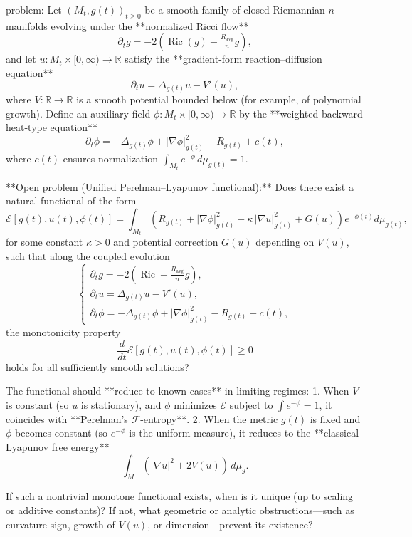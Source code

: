 problem:  
Let \((M_t,g(t))_{t\ge0}\) be a smooth family of closed Riemannian \(n\)-manifolds evolving under the **normalized Ricci flow**
\[
\partial_t g = -2(\operatorname{Ric}(g) - \tfrac{R_{\mathrm{avg}}}{n} g),
\]
and let \(u : M_t\times [0,\infty)\to \mathbb{R}\) satisfy the **gradient-form reaction–diffusion equation**
\[
\partial_t u = \Delta_{g(t)}u - V'(u),
\]
where \(V:\mathbb{R}\to\mathbb{R}\) is a smooth potential bounded below (for example, of polynomial growth).  
Define an auxiliary field \(\phi:M_t\times [0,\infty)\to \mathbb{R}\) by the **weighted backward heat-type equation**
\[
\partial_t \phi = -\Delta_{g(t)}\phi + |\nabla \phi|_{g(t)}^2 - R_{g(t)} + c(t),
\]
where \(c(t)\) ensures normalization \(\int_{M_t} e^{-\phi}\, d\mu_{g(t)} = 1.\)

**Open problem (Unified Perelman–Lyapunov functional):**  
Does there exist a natural functional of the form
\[
\mathcal{E}[g(t),u(t),\phi(t)]
= \int_{M_t}\left(R_{g(t)} + |\nabla\phi|_{g(t)}^2 
+ \kappa\,|\nabla u|_{g(t)}^2 + G(u)\right)e^{-\phi(t)}d\mu_{g(t)},
\]
for some constant \(\kappa>0\) and potential correction \(G(u)\) depending on \(V(u)\), such that along the coupled evolution
\[
\begin{cases}
\partial_t g = -2(\operatorname{Ric} - \tfrac{R_{\mathrm{avg}}}{n} g),\\[0.3em]
\partial_t u = \Delta_{g(t)}u - V'(u),\\[0.3em]
\partial_t \phi = -\Delta_{g(t)}\phi + |\nabla\phi|_{g(t)}^2 - R_{g(t)} + c(t),
\end{cases}
\]
the monotonicity property
\[
\frac{d}{dt}\mathcal{E}[g(t),u(t),\phi(t)]\ge 0
\]
holds for all sufficiently smooth solutions?

The functional should **reduce to known cases** in limiting regimes:
1. When \(V\) is constant (so \(u\) is stationary), and \(\phi\) minimizes \(\mathcal{E}\) subject to \(\int e^{-\phi}=1\), it coincides with **Perelman's \(\mathcal{F}\)-entropy**.
2. When the metric \(g(t)\) is fixed and \(\phi\) becomes constant (so \(e^{-\phi}\) is the uniform measure), it reduces to the **classical Lyapunov free energy**
\[
\int_M (|\nabla u|^2+2V(u))\,d\mu_g.
\]

If such a nontrivial monotone functional exists, when is it unique (up to scaling or additive constants)? If not, what geometric or analytic obstructions—such as curvature sign, growth of \(V(u)\), or dimension—prevent its existence?

